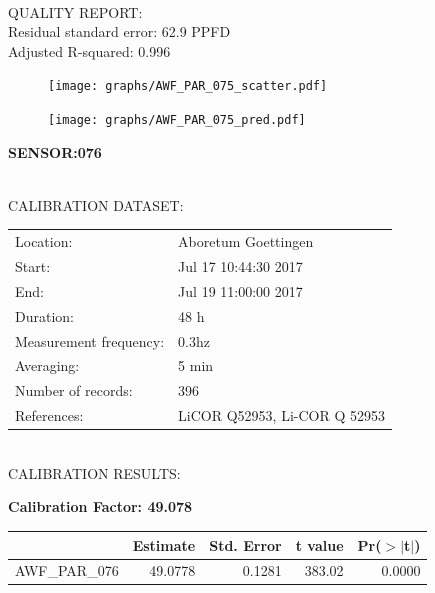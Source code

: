 \documentclass[oneside]{report}
\begin{document}
\hrulefill\\
QUALITY REPORT:\\
Residual standard error: 62.9 PPFD\\
Adjusted R-squared: 0.996



\begin{figure}[H]
  \centering
  \texttt{[image: graphs/AWF\_PAR\_075\_scatter.pdf]}
\end{figure}




\begin{figure}[H]
  \centering
  \texttt{[image: graphs/AWF\_PAR\_075\_pred.pdf]}
\end{figure}

\pagebreak


\begin{center}
\large{\textbf{SENSOR:076}}\\
\end{center}

\hrulefill\\
CALIBRATION DATASET:\\
\begin{table}[h!]
  \centering
  \label{tab:table1}
  \begin{tabular}{ll}
    Location: & Aboretum Goettingen\\ 
    
    
    Start:  & Jul 17 10:44:30 2017 \\
    End:   & Jul 19 11:00:00 2017\\ 
    Duration: & 48 h\\
    Measurement frequency: & 0.3hz\\
    Averaging:  &5 min\\
    Number of records: & 396 \\
    References: & LiCOR Q52953, Li-COR Q 52953 \\
  \end{tabular}
\end{table}

\hrulefill\\
CALIBRATION RESULTS:\\


\begin{center}
\textbf{\large{Calibration Factor: 49.078}}\\
\end{center}
\begin{table}[ht]
\centering
\begin{tabular}{rrrrr}
  \hline
 & Estimate & Std. Error & t value & Pr($>$$|$t$|$) \\ 
  \hline
AWF\_PAR\_076 & 49.0778 & 0.1281 & 383.02 & 0.0000 \\ 
   \hline
\end{tabular}
\end{table}
\end{document}
